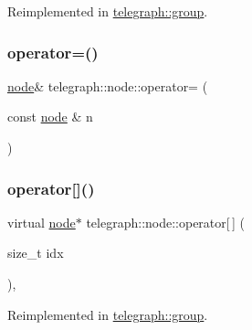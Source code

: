 Reimplemented in \hyperlink{classtelegraph_1_1group_ad5a82543eef530a7b07ca2cdbe6a82f5}{telegraph\+::group}.

\mbox{\label{classtelegraph_1_1node_aa7aacc23330b9b8f98b05f8155481de7}} 
\subsubsection{\texorpdfstring{operator=()}{operator=()}}
{\footnotesize\ttfamily \hyperlink{classtelegraph_1_1node}{node}\& telegraph\+::node\+::operator= (\begin{DoxyParamCaption}\item[{const \hyperlink{classtelegraph_1_1node}{node} \&}]{n }\end{DoxyParamCaption})\hspace{0.3cm}{\ttfamily [delete]}}

\mbox{\label{classtelegraph_1_1node_ad82c9a9af7b7cf132db1c1e74f09254f}} 
\subsubsection{\texorpdfstring{operator[]()}{operator[]()}\hspace{0.1cm}{\footnotesize\ttfamily [1/4]}}
{\footnotesize\ttfamily virtual \hyperlink{classtelegraph_1_1node}{node}$\ast$ telegraph\+::node\+::operator\mbox{[}$\,$\mbox{]} (\begin{DoxyParamCaption}\item[{size\+\_\+t}]{idx }\end{DoxyParamCaption})\hspace{0.3cm}{\ttfamily [inline]}, {\ttfamily [virtual]}}



Reimplemented in \hyperlink{classtelegraph_1_1group_aaf32eea781de1f18d37765793589dda5}{telegraph\+::group}.

\mbox{\label{classtelegraph_1_1node_a4a2a451694b0a4b2c4ec26eee02e46ad}} 

